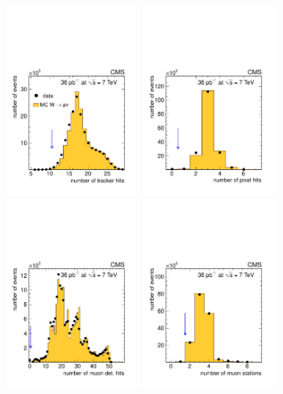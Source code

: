 \begin{figure}
  \begin{center}
   \includegraphics[width=0.39\textwidth]{figs/ntkhits.pdf}
   \includegraphics[width=0.39\textwidth]{figs/npixel.pdf}
   \includegraphics[width=0.39\textwidth]{figs/nmuons.pdf}
   \includegraphics[width=0.39\textwidth]{figs/nmatches.pdf}

\end{center}
\end{figure}
